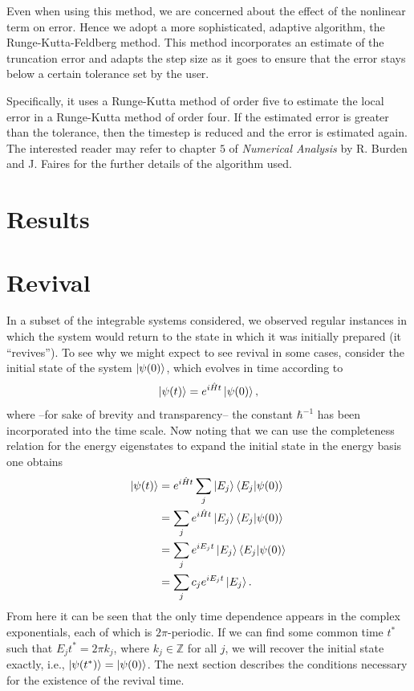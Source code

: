 \documentclass[a4paper, 10pt]{article}
\theoremstyle{plain}
\begin{document}
Even when using this method, we are concerned about the effect of the nonlinear
term on error. Hence we adopt a more sophisticated, adaptive algorithm, the
Runge-Kutta-Feldberg method. This method incorporates an estimate of the
truncation error and adapts the step size as it goes to ensure that the error
stays below a certain tolerance set by the user.

Specifically, it uses a Runge-Kutta method of order five to estimate the
local error in a Runge-Kutta method of order four. If the estimated error
is greater than the tolerance, then the timestep is reduced and the error is
estimated again. The interested reader may refer to chapter $5$ of
\emph{Numerical Analysis} by R. Burden and J. Faires \cite{Burden2005} for the
further details of the algorithm used.
\newpage


\section{Results}

\section{Revival \label{revival}}

In a subset of the integrable systems considered, we observed regular instances
in which the system would return to the state in which it was initially
prepared (it ``revives''). To see why we might expect to see revival in
some cases, consider the initial state of the system $\ket{\psi(0)}$, which
evolves in time according to
\begin{equation}
    \ket{\psi(t)} = e^{i \hat{H} t} \ket{\psi(0)},
\end{equation}
where --for sake of brevity and transparency-- the constant $\hbar^{-1}$ has
been incorporated into the time scale. Now noting that we can use the
completeness relation for the energy eigenstates to expand the initial state in
the energy basis one obtains
\begin{align}
\label{time_evolution}
 \ket{\psi(t)} &= e^{i\hat{H}t}\sum_j\ket{E_j}\braket{E_j|\psi(0)}  \nonumber \\
               &= \sum_je^{i\hat{H}t}\ket{E_j}\braket{E_j|\psi(0)}  \nonumber \\
               &= \sum_je^{iE_{j}t}\ket{E_j}\braket{E_j|\psi(0)}    \nonumber \\
               &= \sum_j c_{j}e^{iE_{j}t}\ket{E_j}.
\end{align}
From here it can be seen that the only time dependence appears in the complex
exponentials, each of which is $2 \pi$-periodic. If we can find some common time
$t^{\ast}$ such that $E_{j} t^{\ast} = 2 \pi k_{j}$, where $k_{j} \in\mathbb{Z}$
for all $j$, we will recover the initial state exactly, i.e.,
$\ket{\psi(t^{\ast})} = \ket{\psi(0)}$. The next section describes the
conditions necessary for the existence of the revival time.
\end{document}
